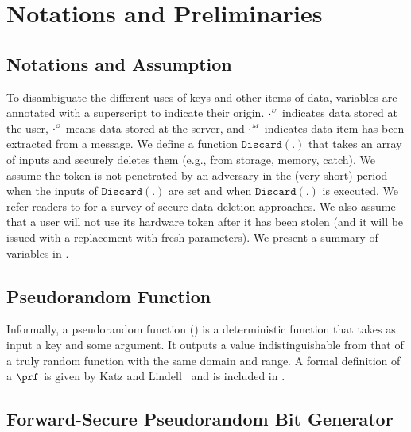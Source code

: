 
\section{Notations and Preliminaries}

 \subsection{Notations and Assumption}
  
 To disambiguate the different uses of keys and other items of data, variables are annotated with a superscript to indicate their origin. $\cdot^{\scriptscriptstyle U}$ indicates data stored at the user, $\cdot^{\scriptscriptstyle S}$ means data stored at the server, and $\cdot^{\scriptscriptstyle M}$ indicates data item has been extracted from a message. We define a function $\mathtt{Discard}(.)$ that takes an array of inputs and securely deletes them (e.g., from storage, memory, catch). We assume the token is not penetrated by an adversary in the (very short) period when the inputs of $\mathtt{Discard}(.)$ are set and when  $\mathtt{Discard}(.)$ is executed. We refer readers to \cite{ReardonBC13} for a survey of secure data deletion approaches. We also assume that a user will not use its hardware token after it has been stolen (and it will be issued with a replacement with fresh parameters). We present a summary of variables in . 
 
 

\subsection{Pseudorandom Function}\label{subsec:PRF}

Informally, a pseudorandom function (\prf) is a deterministic function that takes as input a key and some argument. It outputs a value indistinguishable from that of a truly random function with the same domain and range.  A formal definition of a $\prf$ is given by Katz and Lindell~\cite{KatzLindell2014} and is included in .

\subsection{Forward-Secure Pseudorandom Bit Generator}

